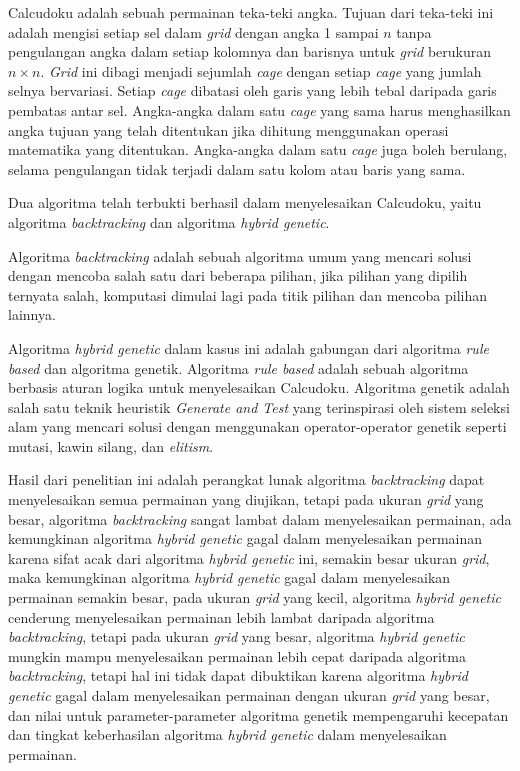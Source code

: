{Calcudoku adalah sebuah permainan teka-teki angka. Tujuan dari teka-teki ini adalah mengisi setiap sel dalam \textit{grid} dengan angka 1 sampai \begin{math}n\end{math} tanpa pengulangan angka dalam setiap kolomnya dan barisnya untuk \textit{grid} berukuran \begin{math}n \times n\end{math}. \textit{Grid} ini dibagi menjadi sejumlah \textit{cage} dengan setiap \textit{cage} yang jumlah selnya bervariasi. Setiap \textit{cage} dibatasi oleh garis yang lebih tebal daripada garis pembatas antar sel. Angka-angka dalam satu \textit{cage} yang sama harus menghasilkan angka tujuan yang telah ditentukan jika dihitung menggunakan operasi matematika yang ditentukan. Angka-angka dalam satu \textit{cage} juga boleh berulang, selama pengulangan tidak terjadi dalam satu kolom atau baris yang sama.

Dua algoritma telah terbukti berhasil dalam menyelesaikan Calcudoku, yaitu algoritma \textit{backtracking} dan algoritma \textit{hybrid genetic}.

Algoritma \textit{backtracking} adalah sebuah algoritma umum yang mencari solusi dengan mencoba salah satu dari beberapa pilihan, jika pilihan yang dipilih ternyata salah, komputasi dimulai lagi pada titik pilihan dan mencoba pilihan lainnya.

Algoritma \textit{hybrid genetic} dalam kasus ini adalah gabungan dari algoritma \textit{rule based} dan algoritma genetik. Algoritma \textit{rule based} adalah sebuah algoritma berbasis aturan logika untuk menyelesaikan Calcudoku. Algoritma genetik adalah salah satu teknik heuristik \textit{Generate and Test} yang terinspirasi oleh sistem seleksi alam yang mencari solusi dengan menggunakan operator-operator genetik seperti mutasi, kawin silang, dan \textit{elitism}.

Hasil dari penelitian ini adalah perangkat lunak algoritma \textit{backtracking} dapat menyelesaikan semua permainan yang diujikan, tetapi pada ukuran \textit{grid} yang besar, algoritma \textit{backtracking} sangat lambat dalam menyelesaikan permainan, ada kemungkinan algoritma \textit{hybrid genetic} gagal dalam menyelesaikan permainan karena sifat acak dari algoritma \textit{hybrid genetic} ini, semakin besar ukuran \textit{grid}, maka kemungkinan algoritma \textit{hybrid genetic} gagal dalam menyelesaikan permainan semakin besar, pada ukuran \textit{grid} yang kecil, algoritma \textit{hybrid genetic} cenderung menyelesaikan permainan lebih lambat daripada algoritma \textit{backtracking}, tetapi pada ukuran \textit{grid} yang besar, algoritma \textit{hybrid genetic} mungkin mampu menyelesaikan permainan lebih cepat daripada algoritma \textit{backtracking}, tetapi hal ini tidak dapat dibuktikan karena algoritma \textit{hybrid genetic} gagal dalam menyelesaikan permainan dengan ukuran \textit{grid} yang besar, dan nilai untuk parameter-parameter algoritma genetik mempengaruhi kecepatan dan tingkat keberhasilan algoritma \textit{hybrid genetic} dalam menyelesaikan permainan.
}
